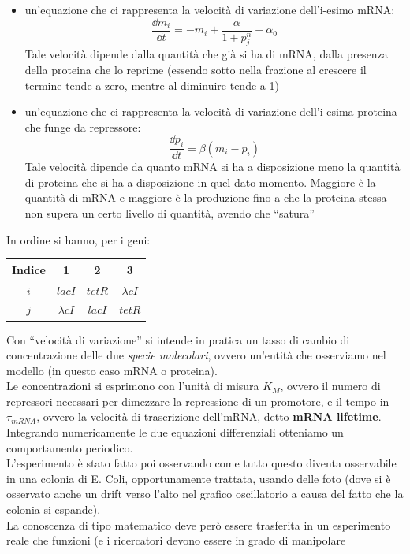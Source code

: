 \documentclass[a4paper,12pt, oneside]{book}
\begin{document}
\begin{itemize}
  \item un'equazione che ci rappresenta la velocità di variazione dell'i-esimo
  mRNA:
  \[\frac{\dd{m_i}}{\dd{t}}=-m_i+\frac{\alpha}{1+p_j^n}+\alpha_0\]
  Tale velocità dipende dalla quantità che già si ha di mRNA, dalla presenza
  della proteina che lo reprime (essendo sotto nella frazione al crescere il
  termine tende a zero, mentre al diminuire tende a 1)
  \item un'equazione che ci rappresenta la velocità di variazione dell'i-esima
  proteina che funge da repressore:
  \[\frac{\dd{p_i}}{\dd{t}}=\beta(m_i-p_i)\]
  Tale velocità dipende da quanto mRNA si ha a disposizione meno la quantità di
  proteina che si ha a disposizione in quel dato momento. Maggiore è la
  quantità di mRNA e maggiore è la produzione fino a che la proteina stessa
  non supera un certo livello di quantità, avendo che ``satura''
\end{itemize}
In ordine si hanno, per i geni:
\begin{table}[H]
  \centering
  \begin{tabular}{c|c|c|c}
    Indice & 1 & 2 & 3\\
    \hline
    \hline
    $i$ & $lacI$ & $ tetR$ & $\lambda cI$\\
    \hline
    $j$ & $\lambda cI$ & $lacI$ & $ tetR$ 
  \end{tabular}
\end{table}
Con ``velocità di variazione'' si intende in pratica un tasso di cambio di
concentrazione delle due \textit{specie molecolari}, ovvero un'entità che
osserviamo nel modello (in questo caso mRNA o proteina). \\
Le concentrazioni si esprimono con l'unità di misura $K_M$, ovvero il numero di
repressori necessari per dimezzare la repressione di un promotore, e il tempo in
$\tau_{mRNA}$, ovvero la velocità di trascrizione dell'mRNA, detto \textbf{mRNA
  lifetime}.
Integrando numericamente le due equazioni differenziali otteniamo un
comportamento periodico.\\
L'esperimento è stato fatto poi osservando come tutto questo diventa osservabile
in una colonia di E. Coli, opportunamente trattata, usando delle foto (dove si è
osservato anche un drift verso l'alto nel grafico oscillatorio a causa del fatto
che la colonia si espande).\\
La conoscenza di tipo matematico deve però essere trasferita in un esperimento
reale che funzioni (e i ricercatori devono essere in grado di manipolare
\end{document}
